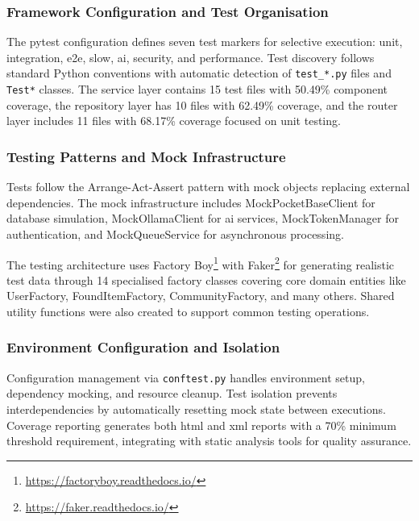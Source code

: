 
\subsubsection{Framework Configuration and Test Organisation}

The pytest configuration defines seven test markers for selective execution: unit, integration, e2e, slow, ai, security, and performance. Test discovery follows standard Python conventions with automatic detection of \texttt{test\_*.py} files and \texttt{Test*} classes. The service layer contains 15 test files with 50.49\% component coverage, the repository layer has 10 files with 62.49\% coverage, and the router layer includes 11 files with 68.17\% coverage focused on unit testing.

\subsubsection{Testing Patterns and Mock Infrastructure}

Tests follow the Arrange-Act-Assert pattern \cite{Wake2001,Beck2002} with mock objects replacing external dependencies. The mock infrastructure includes MockPocketBaseClient for database simulation, MockOllamaClient for \ac{ai} services, MockTokenManager for authentication, and MockQueueService for asynchronous processing.

The testing architecture uses Factory Boy\footnote{\url{https://factoryboy.readthedocs.io/}} with Faker\footnote{\url{https://faker.readthedocs.io/}} for generating realistic test data through 14 specialised factory classes covering core domain entities like UserFactory, FoundItemFactory, CommunityFactory, and many others. Shared utility functions were also created to support common testing operations.

\subsubsection{Environment Configuration and Isolation}

Configuration management via \texttt{conftest.py} handles environment setup, dependency mocking, and resource cleanup. Test isolation prevents interdependencies by automatically resetting mock state between executions. Coverage reporting generates both \ac{html} and \ac{xml} reports with a 70\% minimum threshold requirement, integrating with static analysis tools for quality assurance.

